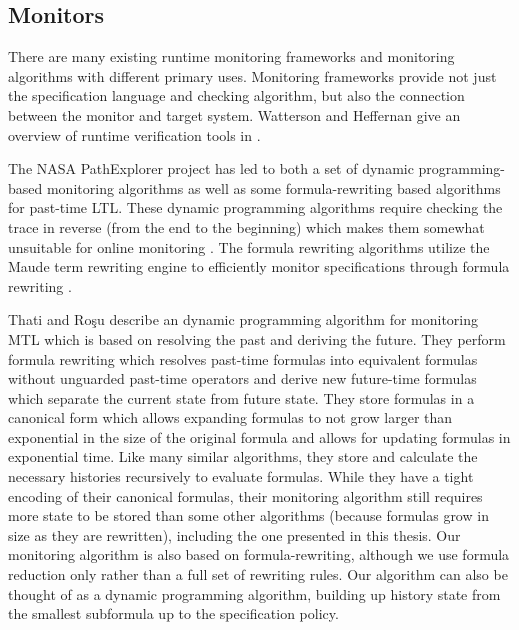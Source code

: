 \subsection{Monitors}
There are many existing runtime monitoring frameworks and monitoring algorithms with different primary uses. Monitoring frameworks provide not just the specification language and checking algorithm, but also the connection between the monitor and target system.
Watterson and Heffernan give an overview of runtime verification tools in \cite{Watterson2007}. 

The NASA PathExplorer project has led to both a set of dynamic programming-based monitoring algorithms as well as some formula-rewriting based algorithms \cite{Havelund2004} for past-time LTL. These dynamic programming algorithms require checking the trace in reverse (from the end to the beginning) which makes them somewhat unsuitable for online monitoring \cite{Havelund2002}. The formula rewriting algorithms utilize the Maude term rewriting engine to efficiently monitor specifications through formula rewriting \cite{Rosu2005}. 

Thati and Ro\c{s}u \cite{Thati2005} describe an dynamic programming algorithm for monitoring MTL which is based on resolving the past and deriving the future. They perform formula rewriting which resolves past-time formulas into equivalent formulas without unguarded past-time operators and derive new future-time formulas which separate the current state from future state. 
They store formulas in a canonical form which allows expanding formulas to not grow larger than exponential in the size of the original formula and allows for updating formulas in exponential time. Like many similar algorithms, they store and calculate the necessary histories recursively to evaluate formulas. While they have a tight encoding of their canonical formulas, their monitoring algorithm still requires more state to be stored than some other algorithms (because formulas grow in size as they are rewritten), including the one presented in this thesis. 
%
Our monitoring algorithm is also based on formula-rewriting, although we use formula reduction only rather than a full set of rewriting rules. Our algorithm can also be thought of as a dynamic programming algorithm, building up history state from the smallest subformula up to the specification policy. 


